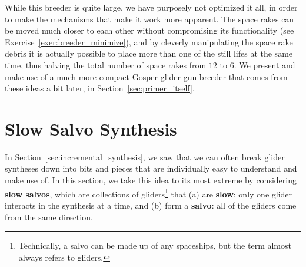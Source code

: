 While this breeder is quite large, we have purposely not optimized it all, in order to make the mechanisms that make it work more apparent. The space rakes can be moved much closer to each other without compromising its functionality (see Exercise~\ref{exer:breeder_minimize}), and by cleverly manipulating the space rake debris it is actually possible to place more than one of the still lifes at the same time, thus halving the total number of space rakes from $12$ to $6$. We present and make use of a much more compact Gosper glider gun breeder that comes from these ideas a bit later, in Section~\ref{sec:primer_itself}.



\section{Slow Salvo Synthesis}\label{sec:slow_salvo}

In Section~\ref{sec:incremental_synthesis}, we saw that we can often break glider syntheses down into bits and pieces that are individually easy to understand and make use of. In this section, we take this idea to its most extreme by considering \textbf{slow salvos}, which are collections of gliders\footnote{Technically, a salvo can be made up of any spaceships, but the term almost always refers to gliders.} that (a) are \textbf{slow}: only one glider interacts in the synthesis at a time, and (b) form a \textbf{salvo}: all of the gliders come from the same direction.

